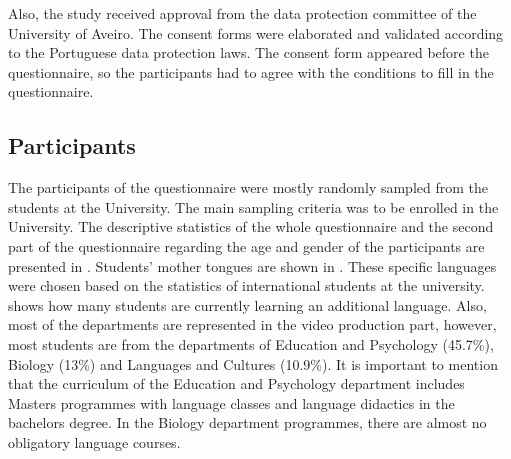 Also, the study received approval from the data protection committee of
the University of Aveiro. The consent forms were elaborated and
validated according to the Portuguese data protection laws. The consent
form appeared before the questionnaire, so the participants had to agree
with the conditions to fill in the questionnaire.

\subsection{Participants}\label{sub-sec-participants}

The participants of the questionnaire were mostly randomly sampled from
the students at the University. The main sampling criteria was to be
enrolled in the University. The descriptive statistics of the whole
questionnaire and the second part of the questionnaire regarding the age
and gender of the participants are presented in . Students'
mother tongues are shown in . These specific languages were
chosen based on the statistics of international students at the
university.  shows how many students are currently learning an
additional language. Also, most of the departments are represented in
the video production part, however, most students are from the
departments of Education and Psychology (45.7\%), Biology (13\%) and
Languages and Cultures (10.9\%). It is important to mention that the
curriculum of the Education and Psychology department includes
Master\textquotesingle s programmes with language classes and language
didactics in the bachelor\textquotesingle s degree. In the Biology
department programmes, there are almost no obligatory language courses.


